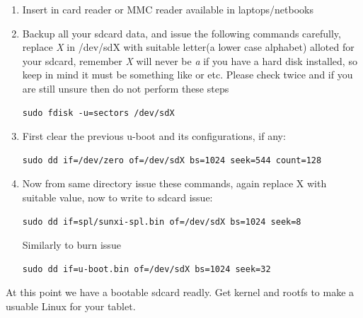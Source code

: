 \documentclass[letterpaper,10pt,english]{sphinxmanual}
\begin{document}
\begin{DUlineblock}{0em}
\item[] 
\end{DUlineblock}
\begin{enumerate}
\item {} 
Insert  in card reader or MMC reader available in laptops/netbooks

\item {} 
Backup all your sdcard data, and issue the following commands carefully, replace
\emph{X} in /dev/sdX with suitable letter(a lower case alphabet) alloted for your
sdcard, remember \emph{X} will never be \emph{a} if you have a hard disk installed, so keep
in mind it must be something like  or  etc. Please check
twice and if you are still unsure then do not perform these steps

\begin{Verbatim}[commandchars=\\\{\}]
sudo fdisk -u=sectors /dev/sdX
\end{Verbatim}

\item {} 
First clear the previous u-boot and its configurations, if any:

\begin{Verbatim}[commandchars=\\\{\}]
sudo dd if=/dev/zero of=/dev/sdX bs=1024 seek=544 count=128
\end{Verbatim}

\item {} 
Now from same  directory issue these commands, again replace
X with suitable value, now to write  to sdcard issue:

\begin{Verbatim}[commandchars=\\\{\}]
sudo dd if=spl/sunxi-spl.bin of=/dev/sdX bs=1024 seek=8
\end{Verbatim}

Similarly to burn  issue

\begin{Verbatim}[commandchars=\\\{\}]
sudo dd if=u-boot.bin of=/dev/sdX bs=1024 seek=32
\end{Verbatim}

\end{enumerate}

At this point we have a bootable sdcard readly. Get kernel and rootfs to make a usuable
Linux for your tablet.
\end{document}
